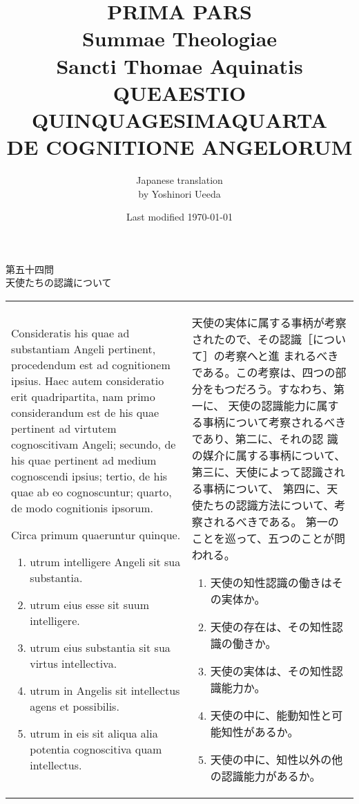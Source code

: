 \documentclass[10pt]{jsarticle} %
\title{{\bf PRIMA PARS}\\{\HUGE Summae Theologiae}\\Sancti Thomae
Aquinatis\\{\sffamily QUEAESTIO QUINQUAGESIMAQUARTA}\\DE COGNITIONE ANGELORUM}
\author{Japanese translation\\by Yoshinori {\sc Ueeda}}
\date{Last modified \today}
\begin{document}
\maketitle
\pagestyle{fancy}

\begin{center}
{\Large 第五十四問\\天使たちの認識について}
\end{center}

\begin{longtable}{p{21em}p{21em}}

Consideratis his quae ad substantiam Angeli pertinent, procedendum est
ad cognitionem ipsius. Haec autem consideratio erit quadripartita, nam
primo considerandum est de his quae pertinent ad virtutem cognoscitivam
Angeli; secundo, de his quae pertinent ad medium cognoscendi ipsius;
tertio, de his quae ab eo cognoscuntur; quarto, de modo cognitionis
ipsorum.

Circa primum quaeruntur quinque. 

\begin{enumerate}
 \item utrum intelligere Angeli sit sua substantia.
 \item utrum eius esse sit suum intelligere. 
 \item utrum eius substantia sit sua virtus intellectiva.
 \item utrum in Angelis sit intellectus agens et possibilis. 
 \item utrum in eis sit aliqua alia potentia cognoscitiva quam intellectus.
\end{enumerate}

&

天使の実体に属する事柄が考察されたので、その認識［について］の考察へと進
まれるべきである。この考察は、四つの部分をもつだろう。すなわち、第一に、
天使の認識能力に属する事柄について考察されるべきであり、第二に、それの認
識の媒介に属する事柄について、第三に、天使によって認識される事柄について、
第四に、天使たちの認識方法について、考察されるべきである。
第一のことを巡って、五つのことが問われる。

\begin{enumerate}
 \item 天使の知性認識の働きはその実体か。
 \item 天使の存在は、その知性認識の働きか。
 \item 天使の実体は、その知性認識能力か。
 \item 天使の中に、能動知性と可能知性があるか。
 \item 天使の中に、知性以外の他の認識能力があるか。
\end{enumerate}

\end{longtable}
\newpage
\end{document}
